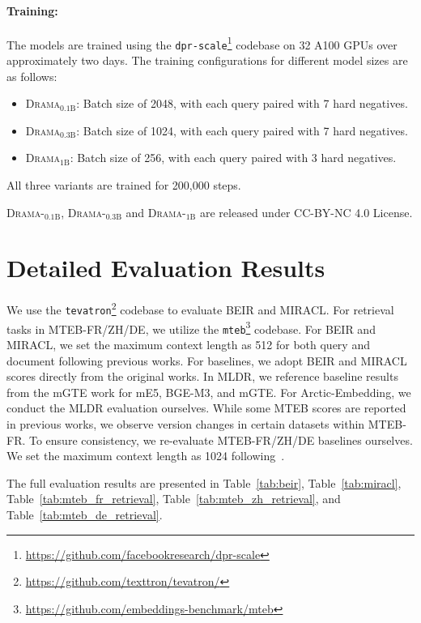 \documentclass[]{fairmeta}
\newcommand{\ourmodel}{\textsc{Drama}}
\begin{document}
\paragraph{Training:} The models are trained using the \texttt{dpr-scale}\footnote{\url{https://github.com/facebookresearch/dpr-scale}} codebase on 32 A100 GPUs over approximately two days. The training configurations for different model sizes are as follows:

\begin{itemize}
    \item \ourmodel{}$_\text{0.1B}$: Batch size of 2048, with each query paired with 7 hard negatives.
    \item \ourmodel{}$_\text{0.3B}$: Batch size of 1024, with each query paired with 7 hard negatives.
    \item \ourmodel{}$_\text{1B}$: Batch size of 256, with each query paired with 3 hard negatives.
\end{itemize}
All three variants are trained for 200,000 steps.

\ourmodel{}-$_\text{0.1B}$, \ourmodel{}-$_\text{0.3B}$ and \ourmodel{}-$_\text{1B}$ are released under CC-BY-NC 4.0 License.


\section{Detailed Evaluation Results}
\label{detailed-results}
We use the \texttt{tevatron}\footnote{\url{https://github.com/texttron/tevatron/}} codebase to evaluate BEIR and MIRACL.
For retrieval tasks in MTEB-FR/ZH/DE, we utilize the \texttt{mteb}\footnote{\url{https://github.com/embeddings-benchmark/mteb}} codebase.
For BEIR and MIRACL, we set the maximum context length as 512 for both query and document following previous works.
For baselines, we adopt BEIR and MIRACL scores directly from the original works.
In MLDR, we reference baseline results from the mGTE work for mE5, BGE-M3, and mGTE. For Arctic-Embedding, we conduct the MLDR evaluation ourselves.
While some MTEB scores are reported in previous works, we observe version changes in certain datasets within MTEB-FR. To ensure consistency, we re-evaluate MTEB-FR/ZH/DE baselines ourselves.
We set the maximum context length as 1024 following~\cite{zhang2024mgte}.

The full evaluation results are presented in Table~\ref{tab:beir}, Table~\ref{tab:miracl}, Table~\ref{tab:mteb_fr_retrieval}, Table~\ref{tab:mteb_zh_retrieval}, and Table~\ref{tab:mteb_de_retrieval}.
\end{document}
